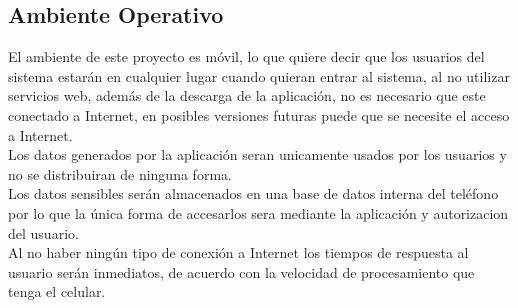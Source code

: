 \documentclass[12pt]{article}
\begin{document}
\newpage
\subsection{Ambiente Operativo}

El ambiente de este proyecto es m\'ovil, lo que quiere decir que los usuarios del sistema estar\'an en cualquier lugar cuando quieran entrar al sistema, al no utilizar servicios web, adem\'as de la descarga de la aplicaci\'on, no es necesario que este conectado a Internet, en posibles versiones futuras puede que se necesite el acceso a Internet.\\ 
Los datos generados por la aplicaci\'on seran unicamente usados por los usuarios y no se distribuiran de ninguna forma.\\
Los datos sensibles ser\'an almacenados en una base de datos interna del tel\'efono por lo que la \'unica forma de accesarlos sera mediante la aplicaci\'on y autorizacion del usuario.\\
Al no haber ning\'un tipo de conexi\'on a Internet los tiempos de respuesta al usuario ser\'an inmediatos, de acuerdo con la velocidad de procesamiento que tenga el celular.
\end{document}

